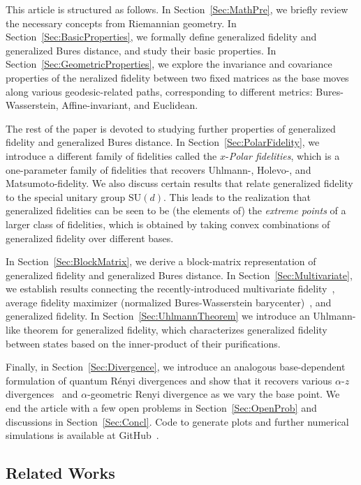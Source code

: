 \documentclass[12pt]{article}
\theoremstyle{definition}
\begin{document}
This article is structured as follows. In Section~\ref{Sec:MathPre}, we briefly review the necessary concepts from Riemannian geometry. In Section~\ref{Sec:BasicProperties}, we formally define generalized fidelity and generalized Bures distance, and study their basic properties. In Section~\ref{Sec:GeometricProperties}, we explore the invariance and covariance properties of the neralized fidelity between two fixed matrices as the base moves along various geodesic-related paths, corresponding to different metrics: Bures-Wasserstein, Affine-invariant, and Euclidean. 

The rest of the paper is devoted to studying further properties of generalized fidelity and generalized Bures distance. In Section~\ref{Sec:PolarFidelity}, we introduce a different family of fidelities called the $x$-\textit{Polar fidelities}, which is a one-parameter family of fidelities that recovers Uhlmann-, Holevo-, and Matsumoto-fidelity. We also discuss certain results that relate generalized fidelity to the special unitary group $\mathrm{SU}(d)$. This leads to the realization that generalized fidelities can be seen to be (the elements of) the \textit{extreme points} of a larger class of fidelities, which is obtained by taking convex combinations of generalized fidelity over different bases.


In Section~\ref{Sec:BlockMatrix}, we derive a block-matrix representation of generalized fidelity and generalized Bures distance. In Section~\ref{Sec:Multivariate}, we establish results connecting the recently-introduced multivariate fidelity~\cite{Wilde2024multivariate}, average fidelity maximizer (normalized Bures-Wasserstein barycenter)~\cite{afham2022, chewi2020gradient}, and generalized fidelity. In Section~\ref{Sec:UhlmannTheorem} we introduce an Uhlmann-like theorem for generalized fidelity, which characterizes generalized fidelity between states based on the inner-product of their purifications.  

Finally, in Section~\ref{Sec:Divergence}, we introduce an analogous base-dependent formulation of quantum R\'enyi divergences and show that it recovers various $\alpha$-$z$ divergences~\cite{audenaert2013alpha} and $\alpha$-geometric Renyi divergence as we vary the base point. We end the article with a few open problems in Section~\ref{Sec:OpenProb} and discussions in Section~\ref{Sec:Concl}. Code to generate plots and further numerical simulations is available at GitHub~\cite{afhamgithub}.


\subsection*{Related Works}
\end{document}
